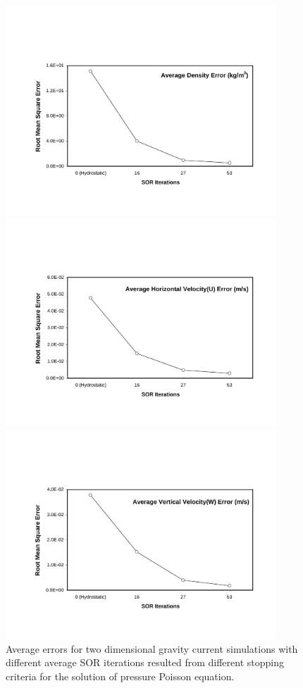 \begin{figure}[h]
\hspace{0.7in} \vspace{0.3in}
\includegraphics[width=4.0in]{../figures/ANH/2D_NX140/density.pdf}

\hspace{0.7in} \vspace{0.3in}
\includegraphics[width=4.0in]{../figures/ANH/2D_NX140/U.pdf}

\hspace{0.7in} \vspace{0.3in}
\includegraphics[width=4.0in]{../figures/ANH/2D_NX140/W.pdf}
\caption{Average errors for two dimensional gravity current simulations with different average SOR iterations resulted from different stopping criteria for the solution of pressure Poisson equation.}
\label{fig:ANH-summary-2D-error}
\end{figure}

\cp
